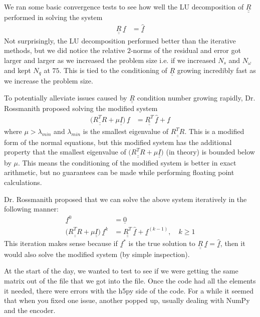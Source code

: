 \documentclass[12pt]{article}
\newcommand{\bunderline}[1]{\underline{#1}}
\renewcommand{\vec}[1]{{\bunderline{#1}}}
\newcommand{\mat}[1]{{\bunderline{\bunderline{#1}}}}
\begin{document}
\par 
We ran some basic convergence tests to see how well the LU decomposition of $\mat{R}$ performed in solving the system 
\begin{align*}
	\mat{R} \, \vec{f} & = \vec{\hat{f}}
\end{align*}
Not surprisingly, the LU decomposition performed better than the iterative methods, but we did notice the relative $2$-norms of the residual and error got larger and larger as we increased the problem size i.e. if we increased  $N_{s}$ and $N_{\omega}$ and kept $N_{q}$ at $75$.
This is tied to the conditioning of $\mat{R}$ growing incredibly fast as we increase the problem size.
\par 
To potentially alleviate issues caused by $\mat{R}$ condition number growing rapidly, Dr. Rossmanith proposed solving the modified system
\begin{align*}
	\Big( \mat{R^{T} R} + \mu \mat{I} \Big) \, \vec{f} & = \mat{R^{T}} \, \vec{\hat{f}} + \vec{f}
\end{align*} 
where $\mu > \lambda_{min}$ and $\lambda_{min}$ is the smallest eigenvalue of $\mat{R^{T} R}$.
This is a modified form of the normal equations, but this modified system has the additional property that the smallest eigenvalue of $\Big( \mat{R^{T}R} + \mu \mat{I} \Big)$ (in theory) is bounded below by $\mu$.
This means the conditioning of the modified system is better in exact arithmetic, but no guarantees can be made while performing floating point calculations.
\par 
Dr. Rossmanith proposed that we can solve the above system iteratively in the following manner:
\begin{align*}
	\vec{f}^{0} & = \vec{0} \\
	\Big( \mat{R^{T} R} + \mu \mat{I} \Big) \, \vec{f}^{k} & = \mat{R^{T}} \, \vec{\hat{f}} + \vec{f}^{(k-1)}, \quad k \geq 1
\end{align*}
This iteration makes sense because if $\vec{f}^{*}$ is the true solution to $\mat{R} \, \vec{f} = \vec{\hat{f}}$, then it would also solve the modified system (by simple inspection).

At the start of the day, we wanted to test to see if we were getting the same matrix out of the file that we got into the file. Once the code had all the elements it needed, there were errors with the h5py side of the code. For a while it seemed that when you fixed one issue, another popped up, usually dealing with NumPy and the encoder. \\
\end{document}
